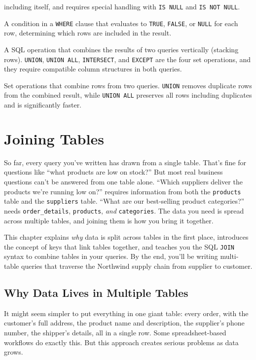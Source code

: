 \documentclass[
  letterpaper,
  DIV=11,
  numbers=noendperiod]{scrreprt}
\begin{document}
\begin{description}
including itself, and requires special handling with \texttt{IS\ NULL}
and \texttt{IS\ NOT\ NULL}.
\item[\textbf{Predicate}]
A condition in a \texttt{WHERE} clause that evaluates to \texttt{TRUE},
\texttt{FALSE}, or \texttt{NULL} for each row, determining which rows
are included in the result.
\item[\textbf{Set Operation}]
A SQL operation that combines the results of two queries vertically
(stacking rows). \texttt{UNION}, \texttt{UNION\ ALL},
\texttt{INTERSECT}, and \texttt{EXCEPT} are the four set operations, and
they require compatible column structures in both queries.
\item[\textbf{UNION / UNION ALL}]
Set operations that combine rows from two queries. \texttt{UNION}
removes duplicate rows from the combined result, while
\texttt{UNION\ ALL} preserves all rows including duplicates and is
significantly faster.
\end{description}

\chapter{Joining Tables}\label{joining-tables}

So far, every query you've written has drawn from a single table. That's
fine for questions like ``what products are low on stock?'' But most
real business questions can't be answered from one table alone. ``Which
suppliers deliver the products we're running low on?'' requires
information from both the \texttt{products} table and the
\texttt{suppliers} table. ``What are our best-selling product
categories?'' needs \texttt{order\_details}, \texttt{products},
\emph{and} \texttt{categories}. The data you need is spread across
multiple tables, and joining them is how you bring it together.

This chapter explains \emph{why} data is split across tables in the
first place, introduces the concept of keys that link tables together,
and teaches you the SQL \texttt{JOIN} syntax to combine tables in your
queries. By the end, you'll be writing multi-table queries that traverse
the Northwind supply chain from supplier to customer.

\section{Why Data Lives in Multiple
Tables}\label{why-data-lives-in-multiple-tables}

It might seem simpler to put everything in one giant table: every order,
with the customer's full address, the product name and description, the
supplier's phone number, the shipper's details, all in a single row.
Some spreadsheet-based workflows do exactly this. But this approach
creates serious problems as data grows.
\end{document}
